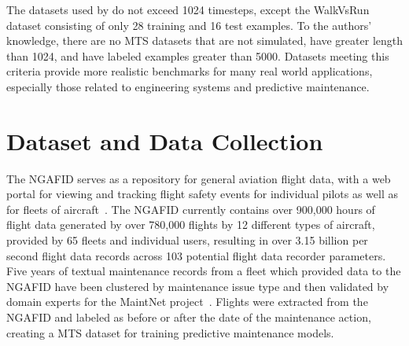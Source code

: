 \documentclass[letterpaper]{article} %
\begin{document}
The datasets used by \cite{fawaz2019deep} do not exceed 1024 timesteps, except the WalkVsRun dataset consisting of only 28 training and 16 test examples. To the authors' knowledge, there are no MTS datasets that are not simulated, have greater length than 1024, and have labeled examples greater than 5000. Datasets meeting this criteria provide more realistic benchmarks for many real world applications, especially those related to engineering systems and predictive maintenance. 




\section{Dataset and Data Collection}

The NGAFID serves as a repository for general aviation flight data, with a web portal for viewing and tracking flight safety events for individual pilots as well as for fleets of aircraft~\cite{karboviak2018classifying}. The NGAFID currently contains over 900,000 hours of flight data generated by over 780,000 flights by 12 different types of aircraft, provided by 65 fleets and individual users, resulting in over 3.15 billion per second flight data records across 103 potential flight data recorder parameters. Five years of textual maintenance records from a fleet which provided data to the NGAFID have been clustered by maintenance issue type and then validated by domain experts for the MaintNet project~\cite{akhbardeh-etal-2020-maintnet}. Flights were extracted from the NGAFID and labeled as before or after the date of the maintenance action, creating a MTS dataset for training predictive maintenance models.
\end{document}
